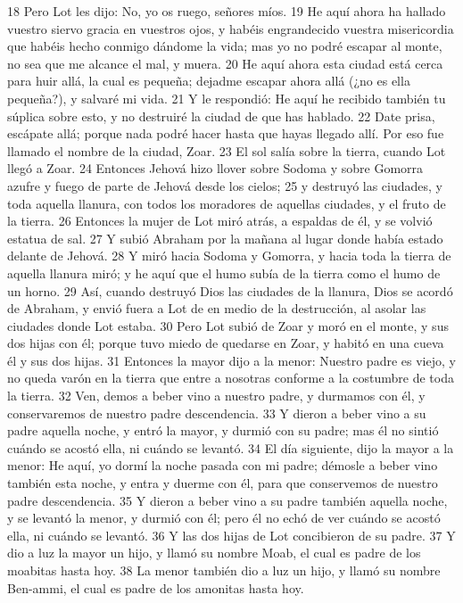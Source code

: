 18 Pero Lot les dijo: No, yo os ruego, señores míos.
19 He aquí ahora ha hallado vuestro siervo gracia en vuestros ojos, y habéis engrandecido vuestra misericordia que habéis hecho conmigo dándome la vida; mas yo no podré escapar al monte, no sea que me alcance el mal, y muera.
20 He aquí ahora esta ciudad está cerca para huir allá, la cual es pequeña; dejadme escapar ahora allá (¿no es ella pequeña?), y salvaré mi vida.
21 Y le respondió: He aquí he recibido también tu súplica sobre esto, y no destruiré la ciudad de que has hablado.
22 Date prisa, escápate allá; porque nada podré hacer hasta que hayas llegado allí. Por eso fue llamado el nombre de la ciudad, Zoar.
23 El sol salía sobre la tierra, cuando Lot llegó a Zoar.
24 Entonces Jehová hizo llover sobre Sodoma y sobre Gomorra azufre y fuego de parte de Jehová desde los cielos;
25 y destruyó las ciudades, y toda aquella llanura, con todos los moradores de aquellas ciudades, y el fruto de la tierra.
26 Entonces la mujer de Lot miró atrás, a espaldas de él, y se volvió estatua de sal.
27 Y subió Abraham por la mañana al lugar donde había estado delante de Jehová.
28 Y miró hacia Sodoma y Gomorra, y hacia toda la tierra de aquella llanura miró; y he aquí que el humo subía de la tierra como el humo de un horno.
29 Así, cuando destruyó Dios las ciudades de la llanura, Dios se acordó de Abraham, y envió fuera a Lot de en medio de la destrucción, al asolar las ciudades donde Lot estaba.
30 Pero Lot subió de Zoar y moró en el monte, y sus dos hijas con él; porque tuvo miedo de quedarse en Zoar, y habitó en una cueva él y sus dos hijas.
31 Entonces la mayor dijo a la menor: Nuestro padre es viejo, y no queda varón en la tierra que entre a nosotras conforme a la costumbre de toda la tierra.
32 Ven, demos a beber vino a nuestro padre, y durmamos con él, y conservaremos de nuestro padre descendencia.
33 Y dieron a beber vino a su padre aquella noche, y entró la mayor, y durmió con su padre; mas él no sintió cuándo se acostó ella, ni cuándo se levantó.
34 El día siguiente, dijo la mayor a la menor: He aquí, yo dormí la noche pasada con mi padre; démosle a beber vino también esta noche, y entra y duerme con él, para que conservemos de nuestro padre descendencia.
35 Y dieron a beber vino a su padre también aquella noche, y se levantó la menor, y durmió con él; pero él no echó de ver cuándo se acostó ella, ni cuándo se levantó.
36 Y las dos hijas de Lot concibieron de su padre.
37 Y dio a luz la mayor un hijo, y llamó su nombre Moab, el cual es padre de los moabitas hasta hoy.
38 La menor también dio a luz un hijo, y llamó su nombre Ben-ammi, el cual es padre de los amonitas hasta hoy.

